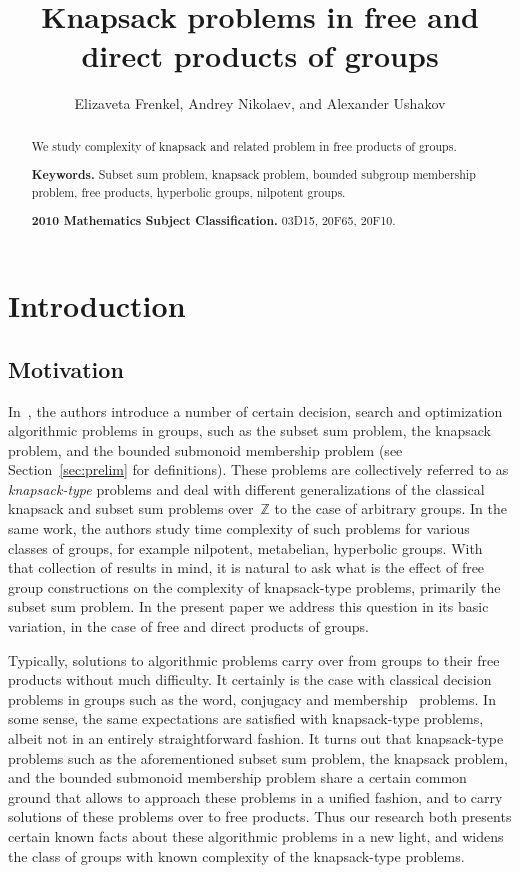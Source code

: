 \documentclass[10pt]{amsart}
\title{Knapsack problems in free and direct products of groups}
\author[]{Elizaveta Frenkel, Andrey Nikolaev, and Alexander Ushakov}
\theoremstyle{definition}
\begin{document}
\begin{abstract}
We study complexity of knapsack and related problem in free products of groups.

\noindent
{\bf Keywords.} Subset sum problem,  knapsack problem, bounded subgroup membership problem, free products, hyperbolic groups, nilpotent groups.

\noindent
{\bf 2010 Mathematics Subject Classification.} 03D15, 20F65, 20F10.
\end{abstract}
\maketitle


\tableofcontents

\section{Introduction}\label{sec:intro}


\subsection{Motivation}\label{sub:motivation}
In~\cite{MNU1}, the authors introduce a number of certain decision, search and optimization algorithmic problems in groups, such as the subset sum problem, the knapsack problem, and the bounded submonoid membership problem (see Section~\ref{sec:prelim} for definitions). These problems are collectively referred to as {\em knapsack-type} problems and deal with different generalizations of the classical knapsack and subset sum problems over~$\mathbb Z$ to the case of arbitrary groups. In the same work, the authors study time complexity of such problems for various classes of groups, for example nilpotent, metabelian, hyperbolic groups. With that collection of results in mind, it is natural to ask what is the effect of free group constructions on the complexity of knapsack-type problems, primarily the subset sum problem. In the present paper we address this question in its basic variation, in the case of free and direct products of groups.

Typically, solutions to algorithmic problems carry over from groups to their free products without much difficulty. It certainly is the case with classical decision problems in groups such as the word, conjugacy and membership~\cite{Mihailova_68} problems. In some sense, the same expectations are satisfied with knapsack-type problems, albeit not in an entirely straightforward fashion. It turns out that knapsack-type problems such as the aforementioned subset sum problem, the knapsack problem, and the bounded submonoid membership problem share a certain common ground that allows to approach these problems in a unified fashion, and to carry solutions of these problems over to free products. Thus our research both presents certain known facts about these algorithmic problems in a new light, and widens the class of groups with known complexity of the knapsack-type problems.
\end{document}
